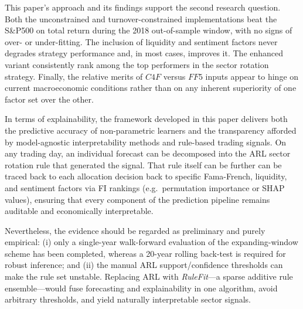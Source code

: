 

This paper's approach and its findings support the second research question. Both the unconstrained and turnover-constrained implementations beat the S\&P500 on total return during the 2018 out-of-sample window, with no signs of over- or under-fitting. The inclusion of liquidity and sentiment factors never degrades strategy performance and, in most cases, improves it. The enhanced variant consistently rank among the top performers in the sector rotation strategy. Finally, the relative merits of $C4F$ versus $FF5$ inputs appear to hinge on current macroeconomic conditions rather than on any inherent superiority of one factor set over the other.

In terms of explainability, the framework developed in this paper delivers both the predictive accuracy of non-parametric learners and the transparency afforded by model-agnostic interpretability methods and rule-based trading signals. On any trading day, an individual forecast can be decomposed into the ARL sector rotation rule that generated the signal. That rule itself can be further can be traced back to each allocation decision back to specific Fama-French, liquidity, and sentiment factors via FI rankings (e.g.\ permutation importance or SHAP values), ensuring that every component of the prediction pipeline remains auditable and economically interpretable.

Nevertheless, the evidence should be regarded as preliminary and purely empirical: (i) only a single-year walk-forward evaluation of the expanding-window scheme has been completed, whereas a 20-year rolling back-test is required for robust inference; and (ii) the manual ARL support/confidence thresholds can make the rule set unstable. Replacing ARL with \emph{RuleFit}—a sparse additive rule ensemble—would fuse forecasting and explainability in one algorithm, avoid arbitrary thresholds, and yield naturally interpretable sector signals.

